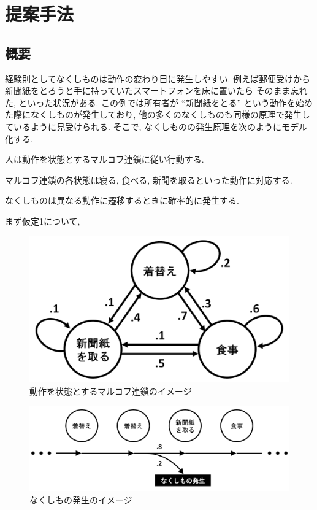 \chapter{提案手法}\label{chap:method}

\section{概要}
経験則としてなくしものは動作の変わり目に発生しやすい. 
例えば郵便受けから新聞紙をとろうと手に持っていたスマートフォンを床に置いたら
そのまま忘れた, といった状況がある.
この例では所有者が “新聞紙をとる” という動作を始めた際になくしものが発生しており, 
他の多くのなくしものも同様の原理で発生しているように見受けられる. 
そこで, なくしものの発生原理を次のようにモデル化する.
\begin{description}
    \item[仮定1]
    人は動作を状態とするマルコフ連鎖に従い行動する.
    \item
    マルコフ連鎖の各状態は寝る, 食べる, 新聞を取るといった動作に対応する.
    \item[仮定2]
    なくしものは異なる動作に遷移するときに確率的に発生する.
\end{description}


まず仮定1について, 
\begin{figure}[H]
    \begin{center}
    \includegraphics[width=0.6\linewidth]{figs/model_1.png}
    \caption{動作を状態とするマルコフ連鎖のイメージ}
    \label{fig:model1}
    \end{center}
\end{figure}

\begin{figure}[H]
    \begin{center}
    \includegraphics[width=0.8\linewidth]{figs/model_2.png}
    \caption{なくしもの発生のイメージ}
    \label{fig:model2}
    \end{center}
\end{figure}

